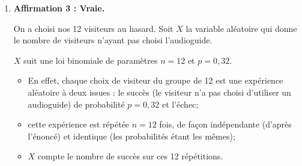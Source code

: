 \documentclass[10pt]{article}
\begin{document}
\begin{enumerate}
	$L$ et $\overline{L}$ formant une partition de l'univers, d'après la loi des probabilités totales, on a :

	$P\big(\, \overline{A}\, \big) = P\big(\, L \cap \overline{A}\, \big) + P\big(\, \overline{L} \cap \overline{A}\, \big)$.

	D'après notre arbre :\quad $P\big(\, L \cap \overline{A} \, \big) = P\big(\, L \,\big) \times P_{\overline{A}}\big(\,L\,\big) = 0,7 \times 0,2 = 0,14$.

	On a donc :\quad $\begin{aligned}[t]
		P\big(\, \overline{A}\, \big) = P\big(\, L \cap \overline{A}\, \big) + P\big(\, \overline{L} \cap \overline{A}\, \big)
		&\iff 0,32 = 0,14 + P\big(\, \overline{L} \cap \overline{A}\, \big)\\
		&\iff P\big(\, \overline{L} \cap \overline{A}\, \big) = 0,32 - 0,14\\
		&\iff P\big(\, \overline{L} \cap \overline{A}\, \big) = 0,18\\
	\end{aligned}$.

	On calcule finalement :\quad $P_{\overline{L}}\big(\,\overline{A}\,\big) = \dfrac{P\big(\,\overline{L} \cap \overline{A}\,\big)}{P\big(\,\overline{L} \,\big) } = \dfrac{0,18}{0,3} = 0,6 < \dfrac{2}{3}$.

	La probabilité qu'un visiteur ne prenne pas l'audioguide sachant qu'il a acheté son billet au guichet est de 0,6, qui est strictement inférieur à deux tiers.

	\item \textbf{Affirmation 3 : Vraie.}

	On a choisi nos 12 visiteurs au hasard. Soit $X$ la variable aléatoire qui donne le nombre de visiteurs n'ayant pas choisi l'audioguide.

	$X$ suit une loi binomiale de paramètres $n=12$ et $p = 0,32$.

	\begin{itemize}
		\item En effet, chaque choix de visiteur du groupe de 12 est une expérience aléatoire à deux issues : le succès (le visiteur n'a pas choisi d'utiliser un audioguide) de probabilité $p = 0,32$ et l'échec;
		\item cette expérience est répétée $n = 12$ fois, de façon indépendante (d'après l'énoncé) et identique (les probabilités étant les mêmes);
		\item $X$ compte le nombre de succès sur ces 12 répétitions.
	\end{itemize}


\end{enumerate}
\end{document}
